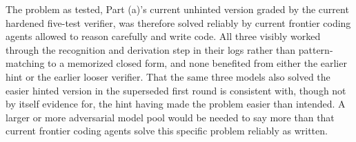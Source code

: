 \documentclass[11pt]{article}
\begin{document}
The problem as tested, Part (a)'s current unhinted version graded by the current
hardened five-test verifier, was therefore solved reliably by current frontier
coding agents allowed to reason carefully and write code. All three visibly
worked through the recognition and derivation step in their logs rather than
pattern-matching to a memorized closed form, and none benefited from either the
earlier hint or the earlier looser verifier. That the same three models also
solved the easier hinted version in the superseded first round is consistent
with, though not by itself evidence for, the hint having made the problem easier
than intended. A larger or more adversarial model pool would be needed to say
more than that current frontier coding agents solve this specific problem
reliably as written.
\end{document}
